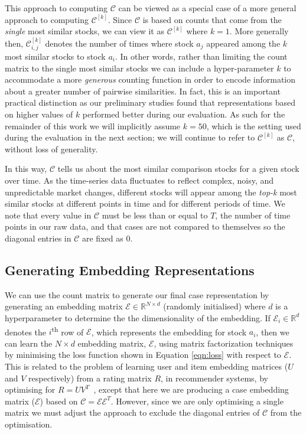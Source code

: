 \documentclass[runningheads]{llncs}
\begin{document}
This approach to computing $\mathcal{C}$ can be viewed as a special case of a more general approach to computing $\mathcal{C}^{[k]}$. Since $\mathcal{C}$ is based on counts that come from the \emph{single} most similar stocks, we can view it as $\mathcal{C}^{[k]}$ where $k=1$. More generally then, $\mathcal{C}^{[k]}_{i,j}$ denotes the number of times where stock $a_j$ appeared among the $k$ most similar stocks to stock $a_i$. In other words, rather than limiting the count matrix to the single most similar stocks we can include a hyper-parameter $k$ to accommodate a more \emph{generous} counting function in order to encode information about a greater number of pairwise similarities. In fact, this is an important practical distinction as our preliminary studies found that representations based on higher values of $k$ performed better during our evaluation. As such for the remainder of this work we will implicitly assume $k=50$, which is the setting used during the evaluation in the next section; we will continue to refer to $\mathcal{C}^{[k]}$ as $\mathcal{C}$, without loss of generality.

In this way, $\mathcal{C}$ tells us about the most similar comparison stocks for a given stock over time. As the time-series data fluctuates to reflect complex, noisy, and unpredictable market changes, different stocks will appear among the \emph{top-k} most similar stocks at different points in time and for different periods of time. We note that every value in $\mathcal{C}$ must be less than or equal to $T$, the number of time points in our raw data, and that cases are not compared to themselves so the diagonal entries in $\mathcal{C}$ are fixed as 0.

\subsection{Generating Embedding Representations}
We can use the count matrix to generate our final case representation by generating an embedding matrix $\mathcal{E}\in\mathbb{R}^{N\times d}$ (randomly initialised) where $d$ is a hyperparameter to determine the the dimensionality of the embedding.
If $\mathcal{E}_i\in\mathbb{R}^{d}$ denotes the $i$\textsuperscript{th} row of $\mathcal{E}$, which represents the embedding for stock $a_i$, then
we can learn the $N\times d$ embedding matrix, $\mathcal{E}$, using matrix factorization techniques by minimising the loss function shown in Equation \ref{eqn:loss} with respect to $\mathcal{E}$. This is related to the problem of learning user and item embedding matrices ($U$ and $V$ respectively) from a rating matrix $R$, in recommender systems, by optimising for $R=UV^T$~\cite{koren2009matrix}, except that here we are producing a case embedding matrix ($\mathcal{E}$) based on $\mathcal{C}=\mathcal{E}\mathcal{E}^T$. However, since we are only optimising a single matrix we must adjust the approach to exclude the diagonal entries of $\mathcal{C}$ from the optimisation.
\end{document}
